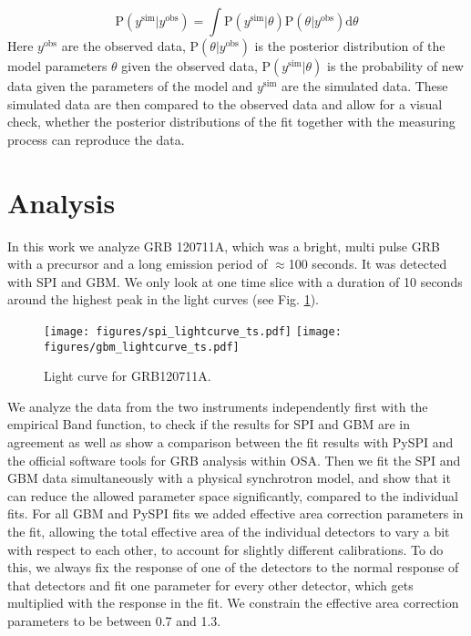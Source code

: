 \documentclass[twocolumn]{aa}
\begin{document}
\begin{equation}
  \textrm{P}(y^{\textrm{sim}}|y^{\textrm{obs}}) = \int \textrm{P}(y^{\textrm{sim}}|\theta) \textrm{P}(\theta|y^{\textrm{obs}}) \mathrm{d}\theta
  \label{eq:ppc}
\end{equation}
\noindent
Here $y^{\textrm{obs}}$ are the observed data, $\textrm{P}(\theta|y^{\textrm{obs}})$ is the posterior distribution of the model parameters $\theta$ given the observed data, $\textrm{P}(y^{\textrm{sim}}|\theta)$ is the probability of new data given the parameters of the model and $y^{\textrm{sim}}$ are the simulated data. These simulated data are then compared to the observed data and allow for a visual check, whether the posterior distributions of the fit together with the measuring process can reproduce the data.
\section{Analysis}

In this work we analyze GRB 120711A, which was a bright, multi pulse GRB with a precursor and a long emission period of $\approx$100 seconds. It was detected with SPI and GBM. We only look at one time slice with a duration of 10 seconds around the highest peak in the light curves (see Fig. \ref{fig:time_selection}).

\begin{figure}
  \begin{centering}
    \texttt{[image: figures/spi\_lightcurve\_ts.pdf]}
    \texttt{[image: figures/gbm\_lightcurve\_ts.pdf]}
    \caption{Light curve for GRB120711A.}
    \label{fig:time_selection}
  \end{centering}
\end{figure}


We analyze the data from the two instruments independently first with the empirical Band function, to check if the results for SPI and GBM are in agreement as well as show a comparison between the fit results with PySPI and the official software tools for GRB analysis within OSA. Then we fit the SPI and GBM data simultaneously with a physical synchrotron model, and show that it can reduce the allowed parameter space significantly, compared to the individual fits. For all GBM and PySPI fits we added effective area correction parameters in the fit, allowing the total effective area of the individual detectors to vary a bit with respect to each other, to account for slightly different calibrations. To do this, we always fix the response of one of the detectors to the normal response of that detectors and fit one parameter for every other detector, which gets multiplied with the response in the fit. We constrain the effective area correction parameters to be between 0.7 and 1.3.
\end{document}
